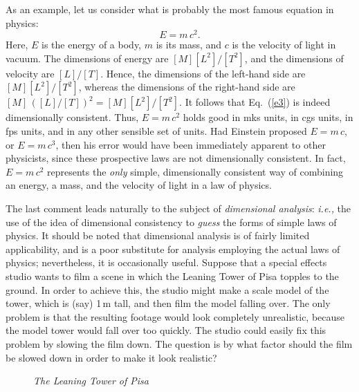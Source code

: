 As an example, let us consider what is probably the most famous equation in physics:
\begin{equation}\label{e3}
E = m\,c^2.
\end{equation}
Here, $E$ is the energy of a body, $m$ is its mass, and $c$ is the velocity of light in
vacuum. The dimensions of energy are $[M][L^2]/[T^2]$, and the dimensions of
velocity are $[L]/[T]$. Hence, the dimensions of the left-hand side are
$[M][L^2]/[T^2]$, whereas the dimensions of the right-hand side are 
$[M]\,([L]/[T])^2= [M][L^2]/[T^2]$. It follows that Eq.~(\ref{e3}) is indeed dimensionally
consistent. Thus, $E=m\,c^2$ holds good in mks units, in cgs units, in  fps units, and in 
any other sensible
set of units. Had Einstein proposed $E=m\,c$, or $E=m\,c^3$, then his error would
 have been immediately apparent to other physicists, since these prospective laws
are not dimensionally consistent. In fact, $E=m\,c^2$ represents the {\em only}\/ simple, dimensionally
consistent way of combining an energy, a mass, and the velocity of light in a law of
physics.

The last comment leads naturally to the subject of {\em dimensional analysis}: {\em i.e.,}
the use of the idea of dimensional consistency to {\em guess} the forms of simple laws of physics.
It should be noted that dimensional analysis is of fairly limited applicability, and
is a poor substitute for analysis employing the actual laws of physics; nevertheless,
it is occasionally useful. Suppose that a special effects studio wants to film a scene
in which the Leaning Tower of Pisa topples to the ground. In order to achieve this, the studio
might make a scale model of the tower, which is (say) 1\,m tall, and then film the model falling over.
The only problem is that the resulting footage would look completely unrealistic, because the model
tower would fall over too quickly. The studio could easily fix this problem by slowing the
film down. The question is by what factor should the film be slowed down in order to make it
look realistic?

\begin{figure}
\epsfysize=3in
\centerline{}
\caption{\em The Leaning Tower of Pisa}\label{f1}   
\end{figure}


